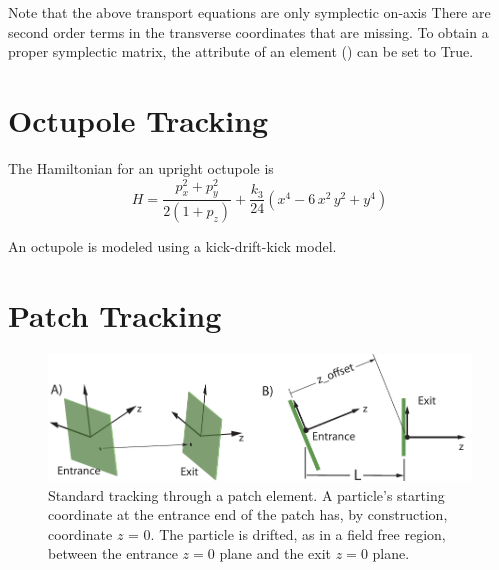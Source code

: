 Note that the above transport equations are only symplectic on-axis
There are second order terms in the transverse coordinates that are
missing. To obtain a proper symplectic matrix, the 
attribute of an  element () can be set to
True.

\section{Octupole Tracking}
\label{s:octupole.std}

The Hamiltonian for an upright octupole is
\begin{equation}
  H = \frac{p_x^2 + p_y^2}{2 (1 + p_z)} + \frac{k_3}{24} (x^4 - 6 \, x^2 \, y^2 + y^4)
\end{equation}

An octupole is modeled using a kick-drift-kick model.

\section{Patch Tracking}
\label{s:patch.std}

\begin{figure}[tb]
  \centering
  \includegraphics[width=5in]{patch.pdf}
  \caption[Standard patch transformation.]
{Standard tracking through a patch element. A particle's starting coordinate at
the entrance end of the patch has, by construction, coordinate $z$ =
0. The particle is drifted, as in a field free region, between the
entrance $z = 0$ plane and the exit $z = 0$ plane.}
  \label{f:patch.track}
\end{figure}


